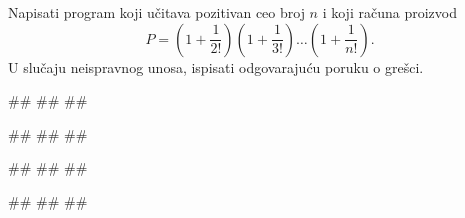 \begin{Exercise}[difficulty=1, label=PET_47] 
Napisati program koji učitava pozitivan ceo broj $n$ i
koji računa proizvod
$$P = (1 + \frac{1}{2!})(1 + \frac{1}{3!})\ldots(1 +
\frac{1}{n!}).$$ 
U slučaju neispravnog unosa, ispisati odgovarajuću poruku o grešci.
  
\begin{miditest}
\begin{upotreba}{1}
#\naslovInt#
##
##
\end{upotreba}
\end{miditest}
\begin{miditest}
\begin{upotreba}{2}
#\naslovInt#
##
##
\end{upotreba}
\end{miditest}

\begin{miditest}
\begin{upotreba}{3}
#\naslovInt#
##
##
\end{upotreba}
\end{miditest}
\begin{miditest}
\begin{upotreba}{4}
#\naslovInt#
##
##
\end{upotreba}
\end{miditest}
\end{Exercise}
\ifresenja
\begin{Answer}[ref=PET_47]
\end{Answer}
\fi


